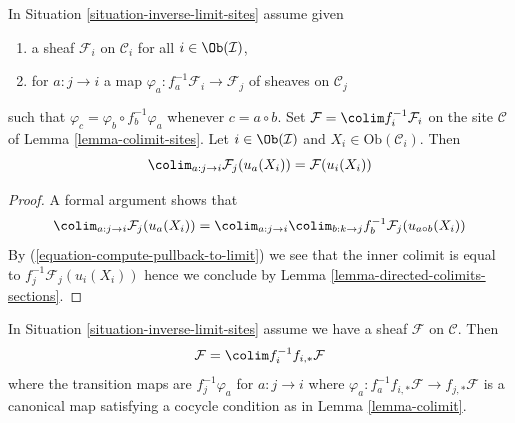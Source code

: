 \begin{lemma}
\label{lemma-colimit}
In Situation \ref{situation-inverse-limit-sites} assume given
\begin{enumerate}
\item a sheaf $\mathcal{F}_i$ on $\mathcal{C}_i$ for all
$i \in \Ob(\mathcal{I})$,
\item for $a : j \to i$ a map
$\varphi_a : f_a^{-1}\mathcal{F}_i \to \mathcal{F}_j$
of sheaves on $\mathcal{C}_j$
\end{enumerate}
such that $\varphi_c = \varphi_b \circ f_b^{-1}\varphi_a$
whenever $c = a \circ b$. Set $\mathcal{F} = \colim f_i^{-1}\mathcal{F}_i$
on the site $\mathcal{C}$ of Lemma \ref{lemma-colimit-sites}.
Let $i \in \Ob(\mathcal{I})$ and $X_i \in \text{Ob}(\mathcal{C}_i)$. Then
$$
\colim_{a : j \to i} \mathcal{F}_j(u_a(X_i)) = \mathcal{F}(u_i(X_i))
$$
\end{lemma}

\begin{proof}
A formal argument shows that
$$
\colim_{a : j \to i} \mathcal{F}_j(u_a(X_i)) =
\colim_{a : j \to i} \colim_{b : k \to j}
f_b^{-1}\mathcal{F}_j(u_{a \circ b}(X_i))
$$
By (\ref{equation-compute-pullback-to-limit})
we see that the inner colimit is equal to
$f_j^{-1}\mathcal{F}_j(u_i(X_i))$ hence we conclude by
Lemma \ref{lemma-directed-colimits-sections}.
\end{proof}

\begin{lemma}
\label{lemma-colimit-push-pull}
In Situation \ref{situation-inverse-limit-sites} assume
we have a sheaf $\mathcal{F}$ on $\mathcal{C}$. Then
$$
\mathcal{F} = \colim f_i^{-1}f_{i, *}\mathcal{F}
$$
where the transition maps are $f_j^{-1}\varphi_a$
for $a : j \to i$ where
$\varphi_a : f_a^{-1}f_{i, *}\mathcal{F} \to f_{j, *}\mathcal{F}$
is a canonical map
satisfying a cocycle condition as in Lemma \ref{lemma-colimit}.
\end{lemma}

